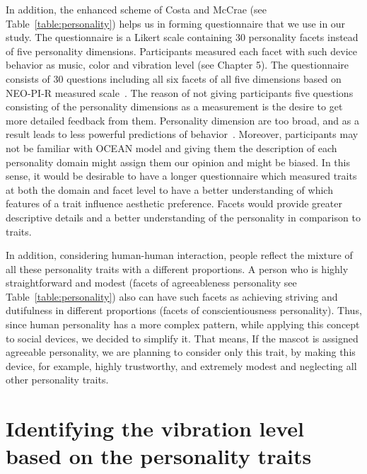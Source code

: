 In addition, the enhanced scheme of Costa and McCrae (see Table~\ref{table:personality})  helps us in forming questionnaire that we use in our study. The questionnaire is a Likert scale containing 30 personality facets instead of five personality dimensions. Participants measured each facet with such device behavior as music, color and vibration level (see Chapter 5). The questionnaire consists of 30 questions including all six facets of all five dimensions based on NEO-PI-R measured scale~\cite{costa2008revised}. The reason of not giving participants five questions consisting of the personality dimensions as a measurement is the desire to get more detailed feedback from them. Personality dimension are too broad, and as a result leads to less powerful predictions of behavior~\cite{paunonen2001big}. Moreover, participants may not be familiar with OCEAN model and giving them the description of each personality domain might assign them our opinion and might be biased. In this sense, it would be desirable to have a longer questionnaire which measured traits at both the domain and facet level to have a better understanding of which features of a trait influence aesthetic preference. Facets would provide greater descriptive details and a better understanding of the personality in comparison to traits.

In addition, considering human-human interaction, people reflect the mixture of all these personality traits with a different proportions. A person who is highly straightforward and modest (facets of agreeableness personality see Table~\ref{table:personality}) also can have such facets as achieving striving and dutifulness in different proportions (facets of conscientiousness personality). Thus, since human personality has a more complex pattern, while applying this concept to social devices, we decided to simplify it. That means, If the mascot is assigned agreeable personality, we are planning to consider only this trait, by making this device, for example, highly trustworthy, and extremely modest and neglecting all other personality traits.

\section{Identifying the vibration level based on the personality traits} 
\label{sec:Identifying the vibration level based on the personality traits}

